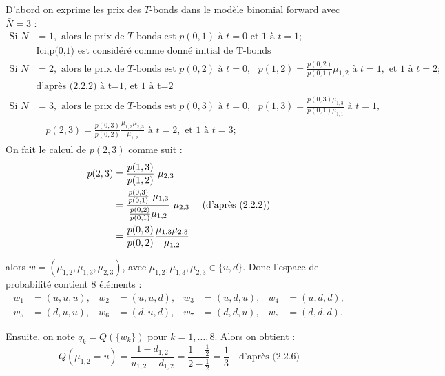 D'abord on exprime les prix des $T$-bonds dans le modèle binomial forward avec $\bar N=3$ : 
\begin{align*}
\text{Si } N &= 1, \text{ alors le prix de } T\text{-bonds est } p(0,1) \text{ à } t=0 \text{ et } 1 \text{ à } t=1; \\
&\text{Ici}, \text{p(0,1) est considéré comme donné initial de T-bonds}\\
\text{Si } N &= 2, \text{ alors le prix de } T\text{-bonds est } p(0,2) \text{ à } t=0, \text{ } p(1,2) = \frac{p(0,2)}{p(0,1)}\mu_{1,2} \text{ à } t=1, \text{ et } 1 \text{ à } t=2; \\
&\text{d'après (2.2.2) à t=1, et 1 à t=2}\\
\text{Si } N &= 3, \text{ alors le prix de } T\text{-bonds est } p(0,3) \text{ à } t=0, \text{ } p(1,3) = \frac{p(0,3)\mu_{1,3}}{p(0,1)\mu_{1,1}} \text{ à } t=1, \\
& \quad p(2,3) = \frac{p(0,3)}{p(0,2)}\frac{\mu_{1,3}\mu_{2,3}}{\mu_{1,2}} \text{ à } t=2, \text{ et } 1 \text{ à } t=3;
\end{align*}
On fait le calcul de $p(2,3)$ comme suit :
\begin{align*}
    p(2,3) 
    &= {p(1,3) \over p(1,2)}\ \mu_{2,3}\\
    &={{p(0,3) \over p(0,1)}\ \mu_{1,3} \over {p(0,2) \over p(0,1)}\mu_{1,2}}\ \mu_{2,3}  \quad \text{  (d'après\ (2.2.2))}\\
    &={p(0,3) \over p(0,2)}{\mu_{1,3}\mu_{2,3} \over \mu_{1,2}}
\end{align*}

alors \(w = (\mu_{1,2}, \mu_{1,3}, \mu_{2,3})\), avec \(\mu_{1,2}, \mu_{1,3}, \mu_{2,3} \in \{u, d\}\). Donc l'espace de probabilité contient 8 éléments :
\begin{align*}
w_1 &= (u, u, u), & w_2 &= (u, u, d), & w_3 &= (u, d, u), & w_4 &= (u, d, d), \\
w_5 &= (d, u, u), & w_6 &= (d, u, d), & w_7 &= (d, d, u), & w_8 &= (d, d, d).
\end{align*}

Ensuite, on note \(q_k = Q(\{w_k\})\) pour \(k = 1, \ldots, 8\). Alors on obtient :
\[
Q(\mu_{1,2} = u) = \frac{1 - d_{1,2}}{u_{1,2} - d_{1,2}} = \frac{1 - \frac{1}{2}}{2 - \frac{1}{2}} = \frac{1}{3} \quad \text{d'après\ (2.2.6)}
\]

